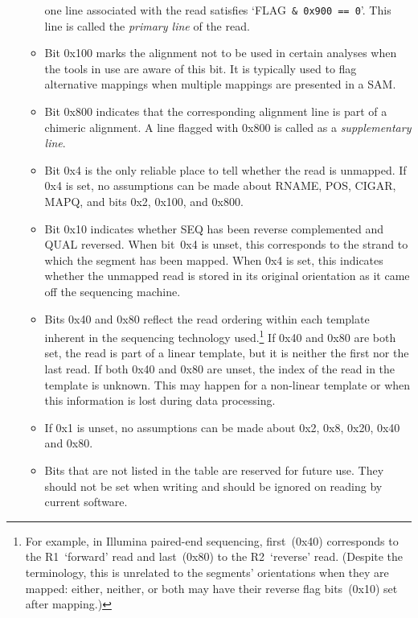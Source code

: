 \begin{enumerate}
\begin{itemize}
        one line associated with the read satisfies \mbox{`{\sf FLAG} {\tt \& 0x900
        == 0}'}. This line is called the \emph{primary line} of the read.
      \item Bit 0x100 marks the alignment not to be used in certain analyses
        when the tools in use are aware of this bit. It is typically used to
        flag alternative mappings when multiple mappings are presented in a SAM.
      \item Bit 0x800 indicates that the corresponding alignment line is part of
        a chimeric alignment. A line flagged with 0x800 is called as a \emph{supplementary line}.
      \item Bit 0x4 is the only reliable place to tell whether the read
        is unmapped. If 0x4 is set, no assumptions can be made about {\sf
          RNAME}, {\sf POS}, {\sf CIGAR}, {\sf MAPQ}, and bits 0x2, 0x100,
        and 0x800.
      \item Bit 0x10 indicates whether {\sf SEQ} has been reverse complemented
        and {\sf QUAL} reversed.
        When bit~0x4 is unset, this corresponds to the strand to which the
        segment has been mapped.
        When 0x4 is set, this indicates whether the unmapped read is stored
        in its original orientation as it came off the sequencing machine.
      \item Bits 0x40 and 0x80 reflect the read ordering within each template
        inherent in the sequencing technology used.\footnote{For example,
        in Illumina paired-end sequencing, {\sf first}~(0x40) corresponds to
        the R1~`forward' read and {\sf last}~(0x80) to the R2~`reverse' read.
        (Despite the terminology, this is unrelated to the segments' orientations
        when they are mapped: either, neither, or both may have their
        {\sf reverse} flag bits~(0x10) set after mapping.)}
        If 0x40 and 0x80 are both set, the read is part of a linear
        template, but it is neither the first nor the last read. If both
        0x40 and 0x80 are unset, the index of the read in the template
        is unknown. This may happen for a non-linear template or when this
        information is lost during data processing.
      \item If 0x1 is unset, no assumptions can be made about 0x2, 0x8,
        0x20, 0x40 and 0x80.
      \item Bits that are not listed in the table are reserved for future use.
        They should not be set when writing and should be ignored on reading
        by current software.

\end{itemize}
\end{enumerate}
